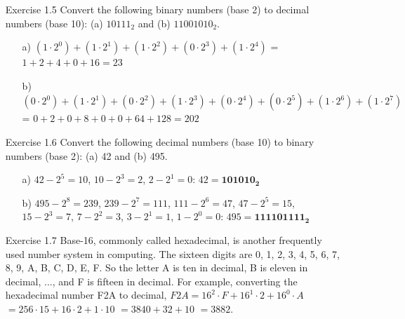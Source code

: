 \documentclass{article}
\begin{document}
\begin{enumerate}
    \item[Exercise 1.5] Convert the following binary numbers (base 2) to decimal numbers (base 10): (a) \(10111_2\) and (b) \(11001010_2\).
    \begin{enumerate}
    \item[a)] \((1\cdot2^0)+(1\cdot2^1)+(1\cdot2^2)+(0\cdot2^3)+(1\cdot2^4)\) = \(1 + 2 + 4 + 0 + 16 = 23\)
    \item[b)] \((0\cdot2^0)+(1\cdot2^1)+(0\cdot2^2)+(1\cdot2^3)+(0\cdot2^4)+(0\cdot2^5)+(1\cdot2^6)+(1\cdot2^7)\) = \(0+2+0+8+0+0+64+128=202\)\newline
    \end{enumerate}

    \item[Exercise 1.6] Convert the following decimal numbers (base 10) to binary numbers (base 2): (a) 42 and (b) 495.
    \begin{enumerate}
    \item[a)] \(42-2^5=10\), \(10-2^3 = 2\), \(2-2^1=0\): \(42 = \boldsymbol{101010_2}\)
    \item[b)] \(495-2^8=239\), \(239-2^7=111\), \(111-2^6=47\), \(47-2^5=15\), \(15-2^3=7\), \(7-2^2=3\), \(3-2^1=1\), \(1-2^0=0\): \(495 = \boldsymbol{111101111_2}\)\newline
    \end{enumerate}

    \item[Exercise 1.7] Base-16, commonly called hexadecimal, is another frequently used number system in computing. The sixteen digits are 0, 1, 2, 3, 4, 5, 6, 7, 8, 9, A, B, C, D, E, F. So the letter A is ten in decimal, B is eleven in decimal, ..., and F is fifteen in decimal. For example, converting the hexadecimal number F2A to decimal,\newline
    \(F2A = 16^2\cdot F + 16^1\cdot2 +16^0\cdot A\)\newline
    \(= 256\cdot15 + 16\cdot2 + 1\cdot10\)\newline
    \(=3840+32+10\)\newline
    \(=3882.\)\newline
    

\end{enumerate}
\end{document}
